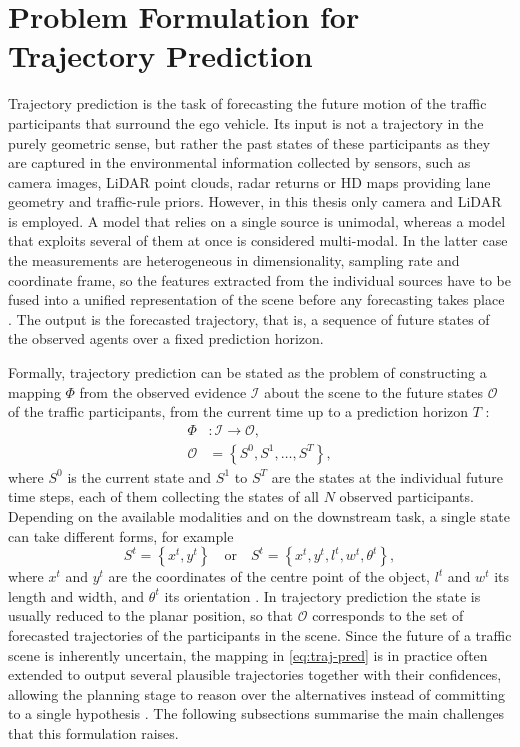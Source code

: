 \section{Problem Formulation for Trajectory Prediction}
Trajectory prediction is the task of forecasting the future motion of the traffic participants that surround
the ego vehicle. Its input is not a trajectory in the purely geometric sense, but rather the past states of
these participants as they are captured in the environmental information collected by sensors,
such as camera images, LiDAR point clouds, radar returns or HD maps providing lane geometry and traffic-rule
priors. However, in this thesis only camera and LiDAR is employed. A model that relies on a single source 
is unimodal, whereas a model that exploits several of them at
once is considered multi-modal. In the latter case the measurements are heterogeneous in dimensionality,
sampling rate and coordinate frame, so the features extracted from the individual sources have to be fused
into a unified representation of the scene before any forecasting takes place \cite{madjid2025survey}. The
output is the forecasted trajectory, that is, a sequence of future states of the observed agents over a fixed
prediction horizon.

Formally, trajectory prediction can be stated as the problem of constructing a mapping $\Phi$ from the
observed evidence $\mathcal{I}$ about the scene to the future states $\mathcal{O}$ of the traffic
participants, from the current time up to a prediction horizon $T$ \cite{hu2025survey}:
\begin{equation}
    \begin{aligned}
        \Phi &: \mathcal{I} \rightarrow \mathcal{O}, \\
        \mathcal{O} &= \left\{ S^{0}, S^{1}, \dots, S^{T} \right\},
    \end{aligned}
    \label{eq:traj-pred}
\end{equation}
where $S^{0}$ is the current state and $S^{1}$ to $S^{T}$ are the states at the individual future time
steps, each of them collecting the states of all $N$ observed participants. Depending on the available
modalities and on the downstream task, a single state can take different forms, for example
\begin{equation}
    S^{t} = \left\{ x^{t}, y^{t} \right\} \quad \text{or} \quad
    S^{t} = \left\{ x^{t}, y^{t}, l^{t}, w^{t}, \theta^{t} \right\},
    \label{eq:state}
\end{equation}
where $x^{t}$ and $y^{t}$ are the coordinates of the centre point of the object, $l^{t}$ and $w^{t}$ its
length and width, and $\theta^{t}$ its orientation \cite{hu2025survey}. In trajectory prediction the state is
usually reduced to the planar position, so that $\mathcal{O}$ corresponds to the set of forecasted
trajectories of the participants in the scene. Since the future of a traffic scene is inherently uncertain,
the mapping in \eqref{eq:traj-pred} is in practice often extended to output several plausible trajectories
together with their confidences, allowing the planning stage to reason over the alternatives instead of
committing to a single hypothesis \cite{huang2022survey}. The following subsections summarise the main
challenges that this formulation raises.


